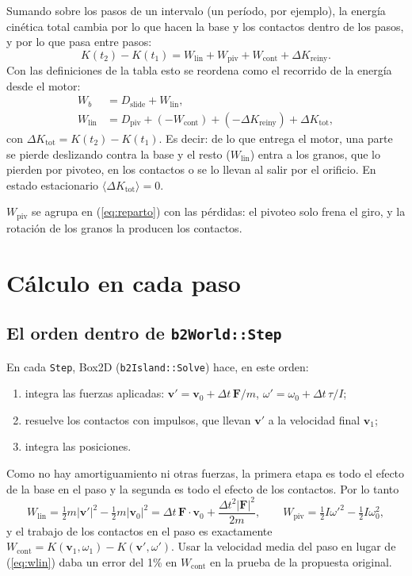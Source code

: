 \documentclass[11pt,a4paper]{article}
\newcommand{\vect}[1]{\mathbf{#1}}
\newcommand{\F}{\vect{F}}
\newcommand{\vv}{\vect{v}}
\newcommand{\code}[1]{\texttt{#1}}
\newcommand{\ave}[1]{\langle #1 \rangle}
\newcommand{\Wb}{W_b}
\newcommand{\Wlin}{W_\text{lin}}
\newcommand{\Wpiv}{W_\text{piv}}
\newcommand{\Wcont}{W_\text{cont}}
\newcommand{\Dslide}{D_\text{slide}}
\newcommand{\Dpiv}{D_\text{piv}}
\newcommand{\dKr}{\Delta K_\text{reiny}}
\begin{document}
Sumando sobre los pasos de un intervalo (un período, por ejemplo), la
energía cinética total cambia por lo que hacen la base y los contactos
dentro de los pasos, y por lo que pasa entre pasos:
\begin{equation}
  K(t_2) - K(t_1) = \Wlin + \Wpiv + \Wcont + \dKr .
  \label{eq:cierre}
\end{equation}
Con las definiciones de la tabla esto se reordena como el recorrido de la
energía desde el motor:
\begin{align}
  \Wb &= \Dslide + \Wlin , \label{eq:motor}\\
  \Wlin &= \Dpiv + (-\Wcont) + (-\dKr) + \Delta K_\text{tot} ,
  \label{eq:reparto}
\end{align}
con $\Delta K_\text{tot} = K(t_2) - K(t_1)$. Es decir: de lo que entrega
el motor, una parte se pierde deslizando contra la base y el resto
($\Wlin$) entra a los granos, que lo pierden por pivoteo, en los contactos
o se lo llevan al salir por el orificio. En estado estacionario
$\ave{\Delta K_\text{tot}} = 0$.

$\Wpiv$ se agrupa en (\ref{eq:reparto}) con las pérdidas: el pivoteo solo
frena el giro, y la rotación de los granos la producen los contactos.

\section{Cálculo en cada paso}
\label{sec:calculo}

\subsection{El orden dentro de \code{b2World::Step}}

En cada \code{Step}, Box2D (\code{b2Island::Solve}) hace, en este orden:
\begin{enumerate}
  \item integra las fuerzas aplicadas:
    $\vv' = \vv_0 + \Delta t\, \F/m$, $\omega' = \omega_0 + \Delta t\,
    \tau / I$;
  \item resuelve los contactos con impulsos, que llevan $\vv'$ a la
    velocidad final $\vv_1$;
  \item integra las posiciones.
\end{enumerate}
Como no hay amortiguamiento ni otras fuerzas, la primera etapa es todo el
efecto de la base en el paso y la segunda es todo el efecto de los
contactos. Por lo tanto
\begin{equation}
  \Wlin = \tfrac12 m |\vv'|^2 - \tfrac12 m |\vv_0|^2
  = \Delta t\, \F \cdot \vv_0 + \frac{\Delta t^2 |\F|^2}{2m} ,
  \qquad
  \Wpiv = \tfrac12 I \omega'^2 - \tfrac12 I \omega_0^2 ,
  \label{eq:wlin}
\end{equation}
y el trabajo de los contactos en el paso es exactamente
$\Wcont = K(\vv_1, \omega_1) - K(\vv', \omega')$. Usar la velocidad media
del paso en lugar de (\ref{eq:wlin}) daba un error del 1\% en $\Wcont$
en la prueba de la propuesta original.
\end{document}
